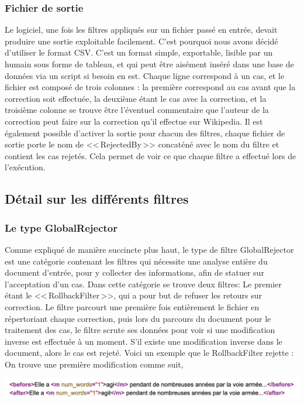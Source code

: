 \documentclass[11pt]{article}
\begin{document}
\subsubsection{Fichier de sortie}
Le logiciel, une fois les filtres appliqu\'{e}s sur un fichier pass\'{e} en entr\'{e}e, devait produire une sortie exploitable facilement. C'est pourquoi nous avons d\'{e}cid\'{e} d'utiliser le format CSV. C'est un format simple, exportable, lisible par un humain sous forme de tableau, et qui peut \^{e}tre ais\'{e}ment ins\'{e}r\'{e} dans une base de donn\'{e}es via un script si besoin en est. Chaque ligne correspond \`{a} un cas, et le fichier est compos\'{e} de trois colonnes : la premi\`{e}re correspond au cas avant que la correction soit effectu\'{e}e, la deuxi\`{e}me \'{e}tant le cas avec la correction, et la troisi\`{e}me colonne se trouve \^{e}tre l'\'{e}ventuel commentaire que l'auteur de la correction peut faire sur la correction qu'il effectue sur Wikipedia.
Il est \'{e}galement possible d'activer la sortie pour chacun des filtres, chaque fichier de sortie porte le nom de <<\,RejectedBy\,>> concat\'{e}n\'{e} avec le nom du filtre et contient les cas rejet\'{e}s. Cela permet de voir ce que chaque filtre a effectu\'{e} lors de l'ex\'{e}cution.

\subsection{D\'{e}tail sur les diff\'{e}rents filtres}
\subsubsection{Le type GlobalRejector}
Comme expliqu\'{e} de mani\`{e}re succincte plus haut, le type de filtre GlobalRejector est une cat\'{e}gorie contenant les filtres qui n\'{e}cessite une analyse enti\`{e}re du document d'entr\'{e}e, pour y collecter des informations, afin de statuer sur l'acceptation d'un cas. 
	Dans cette cat\'{e}gorie se trouve deux filtres:
Le premier \'{e}tant le <<\,RollbackFilter\,>>, qui a pour but de refuser les retours sur correction. Le filtre parcourt une premi\`{e}re fois enti\`{e}rement le fichier en r\'{e}pertoriant chaque correction, puis lors du parcours du document pour le traitement des cas, le filtre scrute ses donn\'{e}es pour voir si une modification inverse est effectu\'{e}e \`{a} un moment. S'il existe une modification inverse dans le document, alors le cas est rejet\'{e}.
Voici un exemple que le RollbackFilter rejette :
On trouve une premi\`{e}re modification comme suit,
\begin{center}
\includegraphics[width=14cm]{exemple10.png} %
\end{center}
\end{document}
